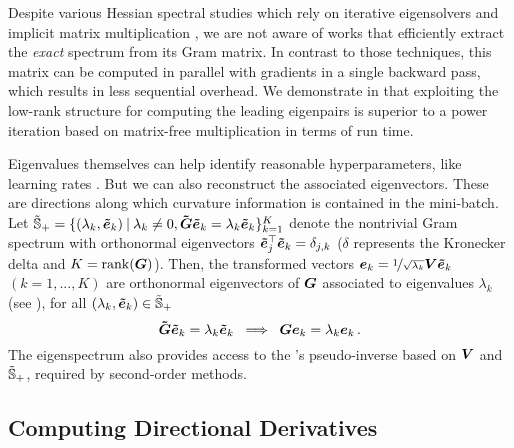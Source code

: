 Despite various Hessian spectral studies which rely on iterative eigensolvers
and implicit matrix multiplication \citep{sagun2017eigenvalues,
  sagun2018empirical, adams2018estimating, ghorbani2019investigation,
  papyan2019spectrum, yao2020pyhessian, granziol2021deep}, we are not aware of
works that efficiently extract the \textit{exact} \ggn spectrum from its Gram
matrix. In contrast to those techniques, this matrix can be computed in parallel
with gradients in a single backward pass, which results in less sequential
overhead. We demonstrate in  that exploiting the
low-rank structure for computing the leading eigenpairs is superior to a power
iteration based on matrix-free multiplication in terms of run time.

Eigenvalues themselves can help identify reasonable hyperparameters, like
learning rates \citep{lecun1993automatic}. But we can also reconstruct the
associated eigenvectors. These are directions along which curvature information
is contained in the mini-batch. Let $\tilde{{\mathbb{S}}}_+ = \{(\lambda_k,
\bm{\tilde{e}}_k)\:|\: \lambda_k \neq 0, \bm{\tilde{{\bm{G}}}} \bm{\tilde{e}}_k = \lambda_k \bm{\tilde{e}}_k
\}_{k=1}^K$ denote the nontrivial Gram spectrum with orthonormal eigenvectors $\bm{\tilde{e}}_j^\top
\bm{\tilde{e}}_k = \delta_{j,k}$ ($\delta$ represents the Kronecker delta and $K =
\mathrm{rank}({\bm{G}})$). Then, the transformed vectors ${\bm{e}}_k =
\nicefrac{1}{\sqrt{\lambda_k}} {\bm{V}} \bm{\tilde{e}}_k$ $(k=1, ..., K)$ are orthonormal
eigenvectors of ${\bm{G}}$ associated to eigenvalues $\lambda_k$ (see
), \ie for all $(\lambda_k,
\bm{\tilde{e}}_k) \in \tilde{{\mathbb{S}}}_+$
\begin{equation}
  \label{vivit::eq:ggn-eigenvectors}
  \bm{\tilde{{\bm{G}}}} \bm{\tilde{e}}_k = \lambda_k \bm{\tilde{e}}_k
  \; \implies \;
  {\bm{G}} {\bm{e}}_k = \lambda_k {\bm{e}}_k \,.
\end{equation}
The eigenspectrum also provides access to the \ggn's pseudo-inverse based on
${\bm{V}}$ and $\tilde{{\mathbb{S}}}_+$, required by \eg second-order methods.

\subsection{Computing Directional Derivatives}
\label{vivit::sec:comp-direct-deriv}

